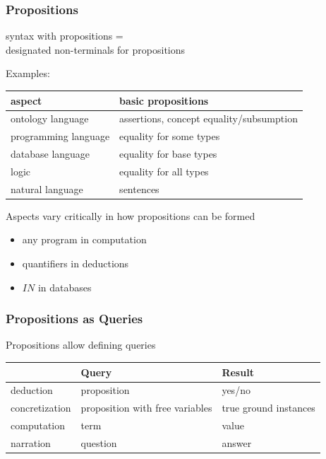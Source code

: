 \documentclass{beamer}
\begin{document}
\begin{frame}\frametitle{Propositions}
syntax with propositions = \\
designated non-terminals for propositions
\medskip

Examples:
\begin{center}
\footnotesize
\begin{tabular}{l|l}
aspect & basic propositions\\
\hline
ontology language & assertions, concept equality/subsumption\\
programming language & equality for some types\\
database language & equality for base types \\
logic & equality for all types\\
natural language & sentences \\
\end{tabular}
\end{center}

Aspects vary critically in how propositions can be formed
\begin{itemize}
\item any program in computation
\item quantifiers in deductions 
\item $IN$ in databases
\end{itemize}
\end{frame}

\begin{frame}\frametitle{Propositions as Queries}
Propositions allow defining queries

\begin{center}
\footnotesize
\begin{tabular}{l|ll}
& Query & Result\\
\hline
deduction & proposition & yes/no \\
concretization & proposition with free variables & true ground instances \\
computation & term & value \\
narration & question & answer \\
\end{tabular}
\end{center}
\end{frame}
\end{document}
